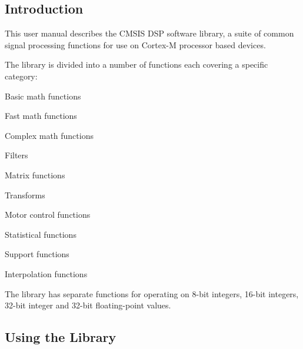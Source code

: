 \subsection*{Introduction }

This user manual describes the C\+M\+S\+IS D\+SP software library, a suite of common signal processing functions for use on Cortex-\/M processor based devices.

The library is divided into a number of functions each covering a specific category\+:
\begin{DoxyItemize}
\item Basic math functions
\item Fast math functions
\item Complex math functions
\item Filters
\item Matrix functions
\item Transforms
\item Motor control functions
\item Statistical functions
\item Support functions
\item Interpolation functions
\end{DoxyItemize}

The library has separate functions for operating on 8-\/bit integers, 16-\/bit integers, 32-\/bit integer and 32-\/bit floating-\/point values.

\subsection*{Using the Library }

